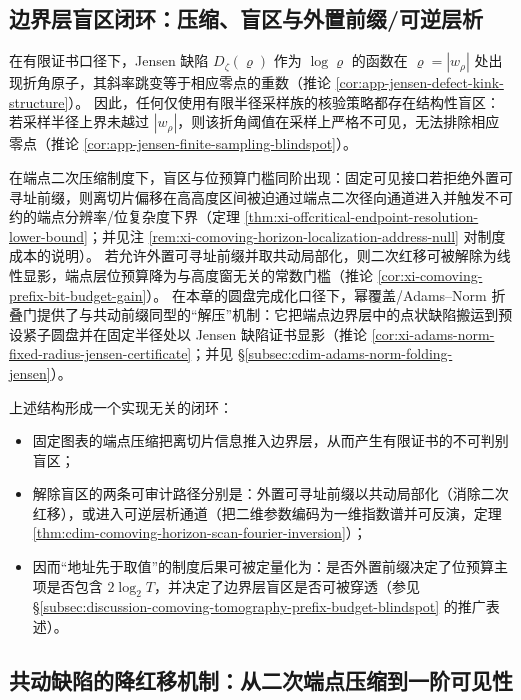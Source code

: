 \subsection{边界层盲区闭环：压缩、盲区与外置前缀/可逆层析}\label{subsec:cdim-boundary-blindspot-loop}
在有限证书口径下，Jensen 缺陷 \(D_{\zeta}(\varrho)\) 作为 \(\log\varrho\) 的函数在 \(\varrho=|w_\rho|\) 处出现折角原子，其斜率跳变等于相应零点的重数（推论 \ref{cor:app-jensen-defect-kink-structure}）。
因此，任何仅使用有限半径采样族的核验策略都存在结构性盲区：若采样半径上界未越过 \(|w_\rho|\)，则该折角阈值在采样上严格不可见，无法排除相应零点（推论 \ref{cor:app-jensen-finite-sampling-blindspot}）。
\par
在端点二次压缩制度下，盲区与位预算门槛同阶出现：固定可见接口若拒绝外置可寻址前缀，则离切片偏移在高高度区间被迫通过端点二次径向通道进入并触发不可约的端点分辨率/位复杂度下界（定理 \ref{thm:xi-offcritical-endpoint-resolution-lower-bound}；并见注 \ref{rem:xi-comoving-horizon-localization-address-null} 对制度成本的说明）。
若允许外置可寻址前缀并取共动局部化，则二次红移可被解除为线性显影，端点层位预算降为与高度窗无关的常数门槛（推论 \ref{cor:xi-comoving-prefix-bit-budget-gain}）。
在本章的圆盘完成化口径下，幂覆盖/Adams--Norm 折叠门提供了与共动前缀同型的“解压”机制：它把端点边界层中的点状缺陷搬运到预设紧子圆盘并在固定半径处以 Jensen 缺陷证书显影（推论 \ref{cor:xi-adams-norm-fixed-radius-jensen-certificate}；并见 \S\ref{subsec:cdim-adams-norm-folding-jensen}）。
\par
上述结构形成一个实现无关的闭环：
\begin{itemize}
  \item 固定图表的端点压缩把离切片信息推入边界层，从而产生有限证书的不可判别盲区；
  \item 解除盲区的两条可审计路径分别是：外置可寻址前缀以共动局部化（消除二次红移），或进入可逆层析通道（把二维参数编码为一维指数谱并可反演，定理 \ref{thm:cdim-comoving-horizon-scan-fourier-inversion}）；
  \item 因而“地址先于取值”的制度后果可被定量化为：是否外置前缀决定了位预算主项是否包含 \(2\log_2T\)，并决定了边界层盲区是否可被穿透（参见 \S\ref{subsec:discussion-comoving-tomography-prefix-budget-blindspot} 的推广表述）。
\end{itemize}

\subsection{共动缺陷的降红移机制：从二次端点压缩到一阶可见性}\label{subsec:cdim-comoving-defect-deredshift}
